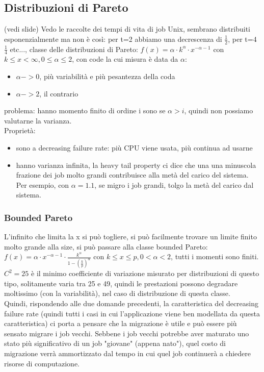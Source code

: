 \documentclass{article}
\begin{document}
\subsection{Distribuzioni di Pareto}\label{pareto}
(vedi slide)
Vedo le raccolte dei tempi di vita di job Unix, sembrano distribuiti esponenzialmente ma non è così: per t=2 abbiamo una decrescenza di $\frac{1}{2}$, per t=4 $\frac{1}{4}$ etc..., classe delle distribuzioni di Pareto: $f(x) = \alpha \cdot k^{\alpha} \cdot x^{-\alpha-1}$ con $k \leq x < \infty, 0 \leq \alpha \leq 2$, con code la cui misura è data da $\alpha$:
\begin{itemize}
\item $\alpha -> 0$, più variabilità e più pesantezza della coda
\item $\alpha -> 2$, il contrario
\end{itemize}
problema: hanno momento finito di ordine i sono se $\alpha > i$, quindi non possiamo valutarne la varianza.\\ Proprietà:
\begin{itemize}
\item sono a decreasing failure rate: più CPU viene usata, più continua ad usarne
\item hanno varianza infinita, la heavy tail property ci dice che una una minuscola frazione dei job molto grandi contribuisce alla metà del carico del sistema. Per esempio, con $\alpha = 1.1$, se migro i job grandi, tolgo la metà del carico dal sistema.
\end{itemize}
\subsubsection{Bounded Pareto}
L'infinito che limita la x si può togliere, si può facilmente trovare un limite finito molto grande alla size, si può passare alla classe bounded Pareto: $f(x) = \alpha \cdot x^{-\alpha - 1} \cdot \frac{k^{\alpha}}{1 - (\frac{k}{p})^{\alpha}}$ con $k \leq x \leq p, 0 < \alpha < 2$, tutti i momenti sono finiti.\\ $C^2 = 25$ è il minimo coefficiente di variazione misurato per distribuzioni di questo tipo, solitamente varia tra 25 e 49, quindi le prestazioni possono degradare moltissimo (con la variabilità), nel caso di distribuzione di questa classe.\\ Quindi, rispondendo alle due domande precedenti, la caratteristica del decreasing failure rate (quindi tutti i casi in cui l'applicazione viene ben modellata da questa caratteristica) ci porta a pensare che la migrazione è utile e può essere più sensato migrare i job vecchi. Sebbene i job vecchi potrebbe aver maturato uno stato più significativo di un job "giovane" (appena nato"), quel costo di migrazione verrà ammortizzato dal tempo in cui quel job continuerà a chiedere risorse di computazione.
\end{document}
